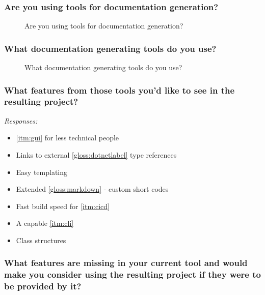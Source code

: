 \subsubsection*{Are you using tools for documentation generation?}

\begin{figure}[H]
    \centering
    \label{fig:qUsingToolsForDocGen}
    \caption{Are you using tools for documentation generation?}
\end{figure}

\subsubsection*{What documentation generating tools do you use?}

\begin{figure}[H]
    \centering
    \caption{What documentation generating tools do you use?}
\end{figure}

\subsubsection*{What features from those tools you'd like to see in the resulting project?}

\textit{Responses:}
\begin{itemize}
    \item \ref{itm:gui} for less technical people
    \item Links to external \ref{gloss:dotnetlabel} type references
    \item Easy templating
    \item Extended \ref{gloss:markdown} - custom short codes
    \item Fast build speed for \ref{itm:cicd}
    \item A capable \ref{itm:cli}
    \item Class structures
\end{itemize}

\subsubsection*{What features are missing in your current tool and would make you consider using the resulting project if they were to be provided by it?}

